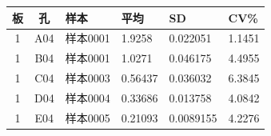 \documentclass[UTF8,10pt,a4paper,fontset=fandol]{ctexart}
\newcommand{\fieldvalue}[1]{#1}
\begin{document}
\begin{center}
\scriptsize
\begin{tabular}{c|c|p{1.5cm}|p{1.0cm}|p{1.2cm}|p{1.0cm}}
板 & 孔 & 样本 & 平均 & SD & CV\% \\ \hline
\fieldvalue{1} &
\fieldvalue{A04} &
\fieldvalue{样本0001} &
\fieldvalue{1.9258} &
\fieldvalue{0.022051} &
\fieldvalue{1.1451} \\

\fieldvalue{1} &
\fieldvalue{B04} &
\fieldvalue{样本0001} &
\fieldvalue{1.0271} &
\fieldvalue{0.046175} &
\fieldvalue{4.4955} \\

\fieldvalue{1} &
\fieldvalue{C04} &
\fieldvalue{样本0003} &
\fieldvalue{0.56437} &
\fieldvalue{0.036032} &
\fieldvalue{6.3845} \\

\fieldvalue{1} &
\fieldvalue{D04} &
\fieldvalue{样本0004} &
\fieldvalue{0.33686} &
\fieldvalue{0.013758} &
\fieldvalue{4.0842} \\

\fieldvalue{1} &
\fieldvalue{E04} &
\fieldvalue{样本0005} &
\fieldvalue{0.21093} &
\fieldvalue{0.0089155} &
\fieldvalue{4.2276} \\


\end{tabular}
\end{center}
\end{document}
